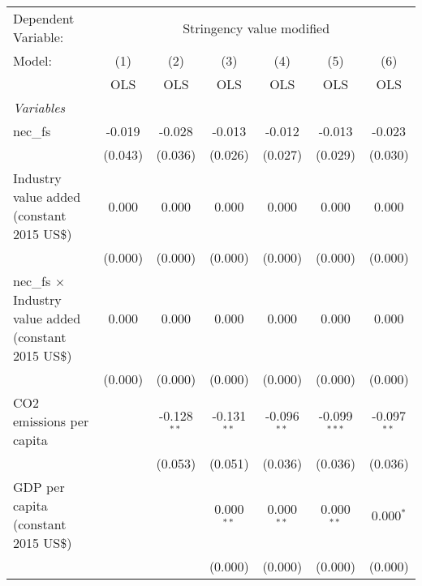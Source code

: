 
\begingroup
\centering
\begin{tabular}{lcccccc}
   \toprule
   Dependent Variable: & \multicolumn{6}{c}{Stringency value modified}\\
   Model:                                                        & (1)     & (2)           & (3)           & (4)            & (5)            & (6)\\  
                                                                 &  OLS    & OLS           & OLS           & OLS            & OLS            & OLS\\  
   \midrule
   \emph{Variables}\\
   nec\_fs                                                       & -0.019  & -0.028        & -0.013        & -0.012         & -0.013         & -0.023\\   
                                                                 & (0.043) & (0.036)       & (0.026)       & (0.027)        & (0.029)        & (0.030)\\   
   Industry value added (constant 2015 US\$)                     & 0.000   & 0.000         & 0.000         & 0.000          & 0.000          & 0.000\\   
                                                                 & (0.000) & (0.000)       & (0.000)       & (0.000)        & (0.000)        & (0.000)\\   
   nec\_fs $\times$ Industry value added (constant 2015 US\$)    & 0.000   & 0.000         & 0.000         & 0.000          & 0.000          & 0.000\\   
                                                                 & (0.000) & (0.000)       & (0.000)       & (0.000)        & (0.000)        & (0.000)\\   
   CO2 emissions per capita                                      &         & -0.128$^{**}$ & -0.131$^{**}$ & -0.096$^{**}$  & -0.099$^{***}$ & -0.097$^{**}$\\   
                                                                 &         & (0.053)       & (0.051)       & (0.036)        & (0.036)        & (0.036)\\   
   GDP per capita (constant 2015 US\$)                           &         &               & 0.000$^{**}$  & 0.000$^{**}$   & 0.000$^{**}$   & 0.000$^{*}$\\   
                                                                 &         &               & (0.000)       & (0.000)        & (0.000)        & (0.000)\\   

\end{tabular}
